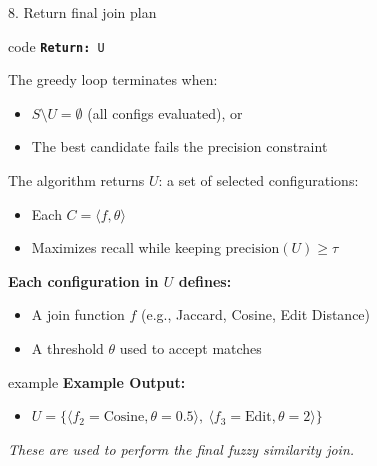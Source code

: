 \documentclass[8pt]{beamer} %
\begin{document}
\begin{frame}{8. Return final join plan}
	
	\begin{beamercolorbox}[rounded=true, shadow=true, leftskip=1em, rightskip=1em]{code}		
	\texttt{\textbf{Return:} U}
	\end{beamercolorbox}
		
	\vspace{0.5em}
	The greedy loop terminates when:
	\begin{itemize}
		\item $S \setminus U = \emptyset$ (all configs evaluated), or
		\item The best candidate fails the precision constraint
	\end{itemize}
	
	\vspace{0.5em}
	The algorithm returns $U$: a set of selected configurations:
	\begin{itemize}
		\item Each $C = \langle f, \theta \rangle$
		\item Maximizes recall while keeping $\text{precision}(U) \geq \tau$
	\end{itemize}
	
	\vspace{0.5em}
	\textbf{Each configuration in $U$ defines:}
	\begin{itemize}
		\item A join function $f$ (e.g., Jaccard, Cosine, Edit Distance)
		\item A threshold $\theta$ used to accept matches
	\end{itemize}
	
	\vspace{0.5em}
	\begin{beamercolorbox}[rounded=true, shadow=true, leftskip=1em, rightskip=1em]{example}		
	\textbf{Example Output:}
	\begin{itemize}
		\item $U = \{ \langle f_2 = \text{Cosine}, \theta = 0.5 \rangle,\ \langle f_3 = \text{Edit}, \theta = 2 \rangle \}$
	\end{itemize}
	\end{beamercolorbox}
		
	\textit{These are used to perform the final fuzzy similarity join.}
\end{frame}
\end{document}
